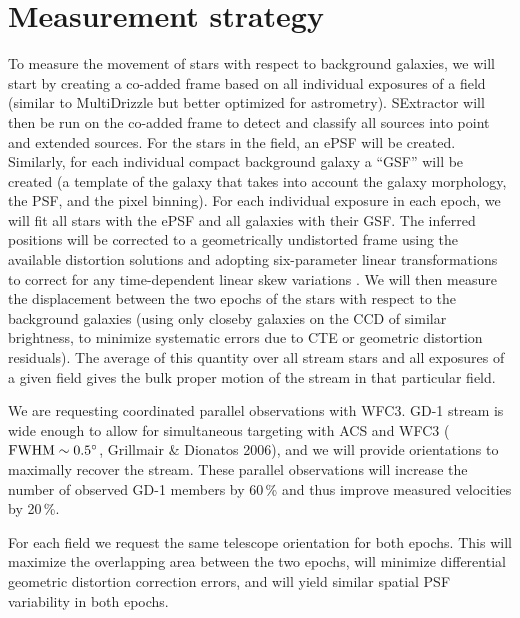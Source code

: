 \documentclass[12pt]{article}
\begin{document}
\section*{Measurement strategy}
To measure the movement of stars with respect to background galaxies, we will start by creating a co-added frame based on all individual exposures of a field (similar to MultiDrizzle but better optimized for astrometry).
SExtractor will then be run on the co-added frame to detect and classify all sources into point and extended sources.
For the stars in the field, an ePSF \parencite[effective Point Spread Function;][]{anderson2003} will be created.
Similarly, for each individual compact background galaxy a ``GSF'' will be created (a template of the galaxy that takes into account the galaxy morphology, the PSF, and the pixel binning).
For each individual exposure in each epoch, we will fit all stars with the ePSF and all galaxies with their GSF.
The inferred positions will be corrected to a geometrically undistorted frame using the available distortion solutions \parencite{anderson2004} and adopting six-parameter linear transformations to correct for any time-dependent linear skew variations \parencite{anderson2007}.
We will then measure the displacement between the two epochs of the stars with respect to the background galaxies (using only closeby galaxies on the CCD of similar brightness, to minimize systematic errors due to CTE or geometric distortion residuals).
The average of this quantity over all stream stars and all exposures of a given field gives the bulk proper motion of the stream in that particular field.



%
%
\specialreq             %
\vspace{-0.5cm}
We are requesting coordinated parallel observations with WFC3.
GD-1 stream is wide enough to allow for simultaneous targeting with ACS and WFC3 ($\rm FWHM\sim0.5^\circ$, Grillmair \& Dionatos 2006), and we will provide orientations to maximally recover the stream.
These parallel observations will increase the number of observed GD-1 members by 60\,\% and thus improve measured velocities by 20\,\%.

For each field we request the same telescope orientation for both epochs.
This will maximize the overlapping area between the two epochs, will minimize differential geometric distortion correction errors, and will yield similar spatial PSF variability in both epochs.
\end{document}
